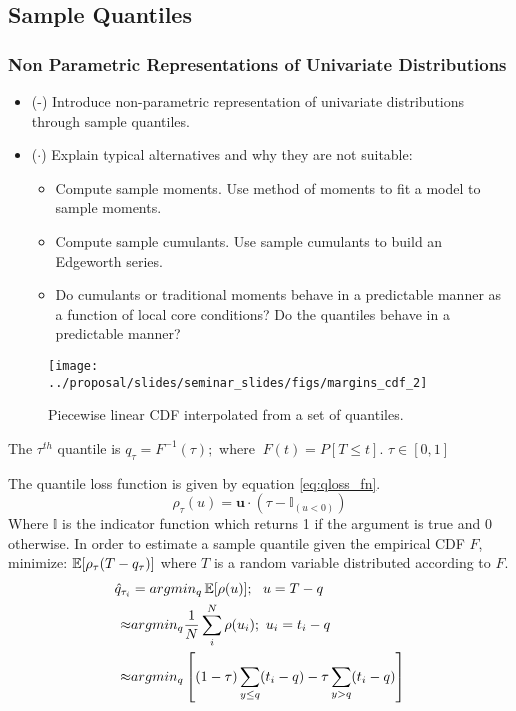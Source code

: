 


\subsection{Sample Quantiles}

\subsubsection{Non Parametric Representations of Univariate Distributions}

\begin{itemize}
    \item (\checkmark-) Introduce non-parametric representation of univariate distributions through sample quantiles.
    \item ($\cdot$) Explain typical alternatives and why they are not suitable:
        \begin{itemize}
            \item Compute sample moments.  Use method of moments to fit a model to sample moments.
            \item Compute sample cumulants.  Use sample cumulants to build an Edgeworth series.
            \item Do cumulants or traditional moments behave in a predictable manner as a function of local core conditions?  Do the quantiles behave in a predictable manner?
        \end{itemize}
\end{itemize}

\begin{figure}[H]
    \centering
    \texttt{[image: ../proposal/slides/seminar\_slides/figs/margins\_cdf\_2]}
    \caption[CDF from quantiles.]{Piecewise linear CDF interpolated from a set of quantiles.}
    \label{fig:marginscdf2}
\end{figure}


The $\tau^{th}$ quantile is $q_\tau = F^{-1}(\tau); $ where $\ F(t)=P[T \leq t]$.
$\tau \in [0, 1]$

The quantile loss function is given by equation \ref{eq:qloss_fn}.
\begin{equation}
\rho_\tau( u) = \mathbf u \cdot (\tau - \mathbb{I}_{( u < 0)})
\label{eq:qloss_fn}
\end{equation}
Where $\mathbb{I}$ is the indicator function which returns 1 if the argument is true and 0 otherwise.
In order to estimate a sample quantile given the empirical CDF $F$, minimize: $\operatorname*{\mathbb{E}}[\rho_\tau(T - q_\tau)]$ where $T$ is a random variable distributed according to $F$.
\begin{equation}
            \left.\begin{aligned}
            \hat q_{\tau_i} &= argmin_{q} \E[\rho(u)];\ \  u = T - q  \\
            \approx & argmin_q  \frac{1}{N} \sum_i^N \rho(u_i); \ u_i = t_i - q \\
            \approx & argmin_q \left[ (1-\tau) \sum_{y \leq q}( t_i - q ) - \tau \sum_{y > q} (t_i - q) \right]
            \end{aligned}\right.
\end{equation}


